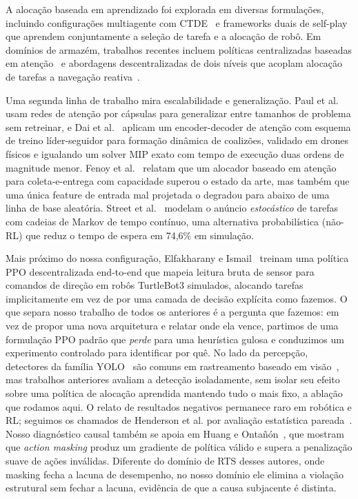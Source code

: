 \documentclass[conference]{IEEEtran}
\begin{document}
A alocação baseada em aprendizado foi explorada em diversas formulações, incluindo configurações multiagente com CTDE~\cite{lowe2017multi} e frameworks duais de self-play~\cite{pal2025together} que aprendem conjuntamente a seleção de tarefa e a alocação de robô. Em domínios de armazém, trabalhos recentes incluem políticas centralizadas baseadas em atenção~\cite{agrawal2023rtaw} e abordagens descentralizadas de dois níveis que acoplam alocação de tarefas a navegação reativa~\cite{agrawal2022dcmrta}.

Uma segunda linha de trabalho mira escalabilidade e generalização. Paul et al.~\cite{paul2022capsule} usam redes de atenção por cápsulas para generalizar entre tamanhos de problema sem retreinar, e Dai et al.~\cite{dai2024dynamic} aplicam um encoder-decoder de atenção com esquema de treino líder-seguidor para formação dinâmica de coalizões, validado em drones físicos e igualando um solver MIP exato com tempo de execução duas ordens de magnitude menor. Fenoy et al.~\cite{fenoy2024attention} relatam que um alocador baseado em atenção para coleta-e-entrega com capacidade superou o estado da arte, mas também que uma única feature de entrada mal projetada o degradou para abaixo de uma linha de base aleatória. Street et al.~\cite{street2024right} modelam o anúncio \emph{estocástico} de tarefas com cadeias de Markov de tempo contínuo, uma alternativa probabilística (não-RL) que reduz o tempo de espera em 74,6\% em simulação.

Mais próximo do nossa configuração, Elfakharany e Ismail~\cite{elfakharany2021endtoend} treinam uma política PPO descentralizada end-to-end que mapeia leitura bruta de sensor para comandos de direção em robôs TurtleBot3 simulados, alocando tarefas implicitamente em vez de por uma camada de decisão explícita como fazemos. O que separa nosso trabalho de todos os anteriores é a pergunta que fazemos: em vez de propor uma nova arquitetura e relatar onde ela vence, partimos de uma formulação PPO padrão que \emph{perde} para uma heurística gulosa e conduzimos um experimento controlado para identificar por quê. No lado da percepção, detectores da família YOLO~\cite{yolov8} são comuns em rastreamento baseado em visão~\cite{ahmed2021topview}, mas trabalhos anteriores avaliam a detecção isoladamente, sem isolar seu efeito sobre uma política de alocação aprendida mantendo tudo o mais fixo, a ablação que rodamos aqui. O relato de resultados negativos permanece raro em robótica e RL; seguimos os chamados de Henderson et al. por avaliação estatística pareada~\cite{henderson2018deep}. Nosso diagnóstico causal também se apoia em Huang e Ontañón~\cite{huang2022masking}, que mostram que \textit{action masking} produz um gradiente de política válido e supera a penalização suave de ações inválidas. Diferente do domínio de RTS desses autores, onde masking fecha a lacuna de desempenho, no nosso domínio ele elimina a violação estrutural sem fechar a lacuna, evidência de que a causa subjacente é distinta.
\end{document}
